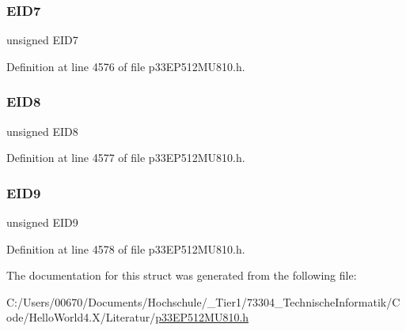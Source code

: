 \subsubsection{\texorpdfstring{E\+I\+D7}{EID7}}
{\footnotesize\ttfamily unsigned E\+I\+D7}



Definition at line 4576 of file p33\+E\+P512\+M\+U810.\+h.

\mbox{\label{structtag_c1_r_x_f14_e_i_d_b_i_t_s_acca25e0b7d86eb499d01f85222baea87}} 
\subsubsection{\texorpdfstring{E\+I\+D8}{EID8}}
{\footnotesize\ttfamily unsigned E\+I\+D8}



Definition at line 4577 of file p33\+E\+P512\+M\+U810.\+h.

\mbox{\label{structtag_c1_r_x_f14_e_i_d_b_i_t_s_ac6748f73d4ada8538b06548be4f396c2}} 
\subsubsection{\texorpdfstring{E\+I\+D9}{EID9}}
{\footnotesize\ttfamily unsigned E\+I\+D9}



Definition at line 4578 of file p33\+E\+P512\+M\+U810.\+h.



The documentation for this struct was generated from the following file\+:\begin{DoxyCompactItemize}
\item 
C\+:/\+Users/00670/\+Documents/\+Hochschule/\+\_\+\+Tier1/73304\+\_\+\+Technische\+Informatik/\+Code/\+Hello\+World4.\+X/\+Literatur/\hyperlink{p33_e_p512_m_u810_8h}{p33\+E\+P512\+M\+U810.\+h}\end{DoxyCompactItemize}
